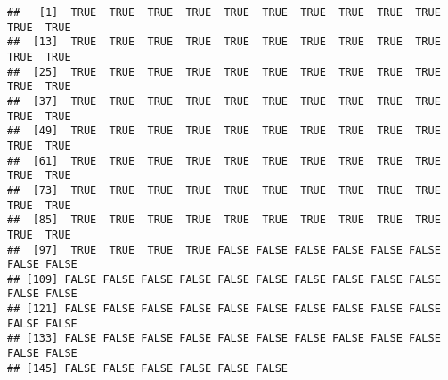 \documentclass[
]{article}
\newenvironment{Shaded}{\begin{snugshade}}{\end{snugshade}}
\newcommand{\FunctionTok}[1]{\textcolor[rgb]{0.13,0.29,0.53}{\textbf{#1}}}
\newcommand{\NormalTok}[1]{#1}
\newcommand{\SpecialCharTok}[1]{\textcolor[rgb]{0.81,0.36,0.00}{\textbf{#1}}}
\newcommand{\StringTok}[1]{\textcolor[rgb]{0.31,0.60,0.02}{#1}}
\begin{document}
\begin{verbatim}
##   [1]  TRUE  TRUE  TRUE  TRUE  TRUE  TRUE  TRUE  TRUE  TRUE  TRUE  TRUE  TRUE
##  [13]  TRUE  TRUE  TRUE  TRUE  TRUE  TRUE  TRUE  TRUE  TRUE  TRUE  TRUE  TRUE
##  [25]  TRUE  TRUE  TRUE  TRUE  TRUE  TRUE  TRUE  TRUE  TRUE  TRUE  TRUE  TRUE
##  [37]  TRUE  TRUE  TRUE  TRUE  TRUE  TRUE  TRUE  TRUE  TRUE  TRUE  TRUE  TRUE
##  [49]  TRUE  TRUE  TRUE  TRUE  TRUE  TRUE  TRUE  TRUE  TRUE  TRUE  TRUE  TRUE
##  [61]  TRUE  TRUE  TRUE  TRUE  TRUE  TRUE  TRUE  TRUE  TRUE  TRUE  TRUE  TRUE
##  [73]  TRUE  TRUE  TRUE  TRUE  TRUE  TRUE  TRUE  TRUE  TRUE  TRUE  TRUE  TRUE
##  [85]  TRUE  TRUE  TRUE  TRUE  TRUE  TRUE  TRUE  TRUE  TRUE  TRUE  TRUE  TRUE
##  [97]  TRUE  TRUE  TRUE  TRUE FALSE FALSE FALSE FALSE FALSE FALSE FALSE FALSE
## [109] FALSE FALSE FALSE FALSE FALSE FALSE FALSE FALSE FALSE FALSE FALSE FALSE
## [121] FALSE FALSE FALSE FALSE FALSE FALSE FALSE FALSE FALSE FALSE FALSE FALSE
## [133] FALSE FALSE FALSE FALSE FALSE FALSE FALSE FALSE FALSE FALSE FALSE FALSE
## [145] FALSE FALSE FALSE FALSE FALSE FALSE
\end{verbatim}

\begin{Shaded}
\end{Shaded}
\end{document}
